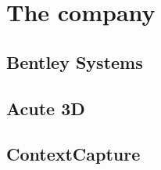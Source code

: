 \chapter{The company}
\label{ch:company}


\section{Bentley Systems}


\section{Acute 3D}


\section{ContextCapture}